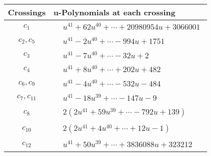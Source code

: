 \documentclass[1p]{elsarticle_modified}
\theoremstyle{definition}
\begin{document}
\begin{tabular}{m{50pt}|m{274pt}}
Crossings & \hspace{64pt}u-Polynomials at each crossing \\
\hline $$\begin{aligned}c_{1}\end{aligned}$$&$\begin{aligned}
&u^{41}+62 u^{40}+\cdots+20980954 u+3066001
\end{aligned}$\\
\hline $$\begin{aligned}c_{2},c_{5}\end{aligned}$$&$\begin{aligned}
&u^{41}-2 u^{40}+\cdots-994 u+1751
\end{aligned}$\\
\hline $$\begin{aligned}c_{3}\end{aligned}$$&$\begin{aligned}
&u^{41}-7 u^{40}+\cdots-32 u+2
\end{aligned}$\\
\hline $$\begin{aligned}c_{4}\end{aligned}$$&$\begin{aligned}
&u^{41}+8 u^{40}+\cdots+202 u+482
\end{aligned}$\\
\hline $$\begin{aligned}c_{6},c_{9}\end{aligned}$$&$\begin{aligned}
&u^{41}-4 u^{40}+\cdots-532 u-484
\end{aligned}$\\
\hline $$\begin{aligned}c_{7},c_{11}\end{aligned}$$&$\begin{aligned}
&u^{41}-18 u^{39}+\cdots-147 u-9
\end{aligned}$\\
\hline $$\begin{aligned}c_{8}\end{aligned}$$&$\begin{aligned}
&2(2 u^{41}+59 u^{39}+\cdots-792 u+139)
\end{aligned}$\\
\hline $$\begin{aligned}c_{10}\end{aligned}$$&$\begin{aligned}
&2(2 u^{41}+4 u^{40}+\cdots+12 u-1)
\end{aligned}$\\
\hline $$\begin{aligned}c_{12}\end{aligned}$$&$\begin{aligned}
&u^{41}+50 u^{39}+\cdots+3836088 u+323212
\end{aligned}$\\
\hline
\end{tabular}\\~\\
\end{document}
